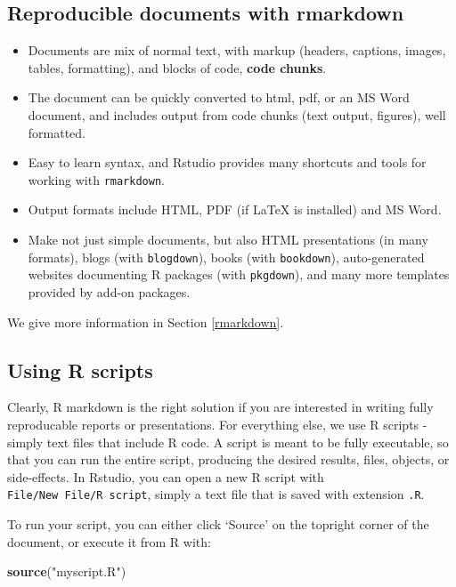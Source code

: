 \documentclass[]{book}
\newenvironment{Shaded}{\begin{snugshade}}{\end{snugshade}}
\newcommand{\KeywordTok}[1]{\textcolor[rgb]{0.13,0.29,0.53}{\textbf{#1}}}
\newcommand{\NormalTok}[1]{#1}
\newcommand{\StringTok}[1]{\textcolor[rgb]{0.31,0.60,0.02}{#1}}
\providecommand{\tightlist}{%
  \setlength{\itemsep}{0pt}\setlength{\parskip}{0pt}}
\begin{document}
\hypertarget{reproducible-documents-with-rmarkdown}{%
\subsection{Reproducible documents with rmarkdown}\label{reproducible-documents-with-rmarkdown}}

\begin{itemize}
\tightlist
\item
  Documents are mix of normal text, with markup (headers, captions, images, tables, formatting), and blocks of code, \textbf{code chunks}.
\item
  The document can be quickly converted to html, pdf, or an MS Word document, and includes output from code chunks (text output, figures), well formatted.
\item
  Easy to learn syntax, and Rstudio provides many shortcuts and tools for working with \texttt{rmarkdown}.
\item
  Output formats include HTML, PDF (if LaTeX is installed) and MS Word.
\item
  Make not just simple documents, but also HTML presentations (in many formats), blogs (with \texttt{blogdown}), books (with \texttt{bookdown}), auto-generated websites documenting R packages (with \texttt{pkgdown}), and many more templates provided by add-on packages.
\end{itemize}

We give more information in Section \ref{rmarkdown}.

\hypertarget{scripts}{%
\subsection{Using R scripts}\label{scripts}}

Clearly, R markdown is the right solution if you are interested in writing fully reproducable reports or presentations. For everything else, we use R scripts - simply text files that include R code. A script is meant to be fully executable, so that you can run the entire script, producing the desired results, files, objects, or side-effects. In Rstudio, you can open a new R script with \texttt{File/New\ File/R\ script}, simply a text file that is saved with extension \texttt{.R}.

To run your script, you can either click `Source' on the topright corner of the document, or execute it from R with:

\begin{Shaded}
\begin{Highlighting}[]
\KeywordTok{source}\NormalTok{(}\StringTok{"myscript.R"}\NormalTok{)}
\end{Highlighting}
\end{Shaded}
\end{document}
